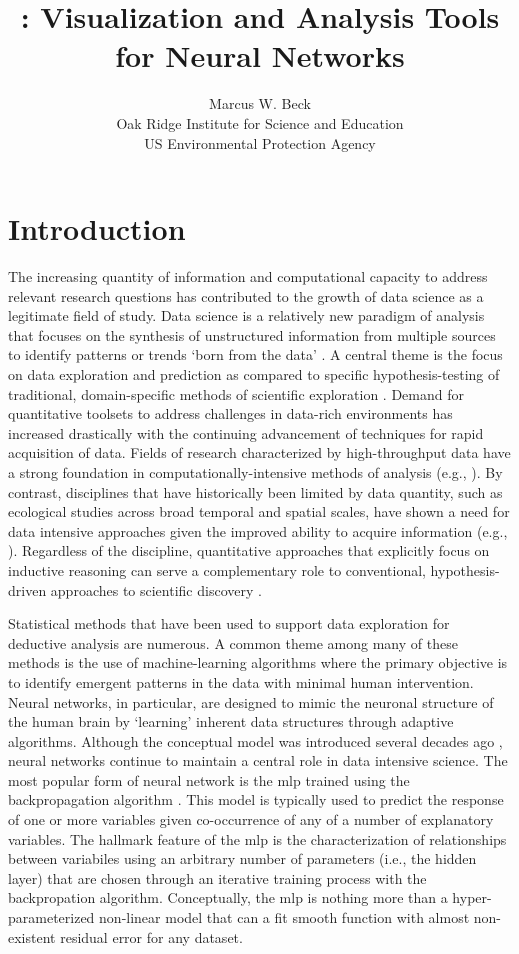 \documentclass[article]{jss}\usepackage[]{graphicx}\usepackage[]{color}
\author{Marcus W. Beck\\Oak Ridge Institute for Science and Education\\US Environmental Protection Agency}
\title{\pkg{NeuralNetTools}: Visualization and Analysis Tools for Neural Networks}
\begin{document}

\section[Introduction]{Introduction}

The increasing quantity of information and computational capacity to address relevant research questions has contributed to the growth of data science as a legitimate field of study.   Data science is a relatively new paradigm of analysis that focuses on the synthesis of unstructured information from multiple sources to identify patterns or trends `born from the data' \citep{Kelling09}.  A central theme is the focus on data exploration and prediction as compared to specific hypothesis-testing of traditional, domain-specific methods of scientific exploration \citep{Kell03}.  Demand for quantitative toolsets to address challenges in data-rich environments has increased drastically with the continuing advancement of techniques for rapid acquisition of data. Fields of research characterized by high-throughput data have a strong foundation in computationally-intensive methods of analysis (e.g., \citet{Saeys07}).  By contrast, disciplines that have historically been limited by data quantity, such as ecological studies across broad temporal and spatial scales, have shown a need for data intensive approaches given the improved ability to acquire information (e.g., \citet{Swanson15}).  Regardless of the discipline, quantitative approaches that explicitly focus on  inductive reasoning can serve a complementary role to conventional, hypothesis-driven approaches to scientific discovery \citep{Kell03}.  

Statistical methods that have been used to support data exploration for deductive analysis are numerous.  A common theme among many of these methods is the use of machine-learning algorithms where the primary objective is to identify emergent patterns in the data with minimal human intervention.  Neural networks, in particular, are designed to mimic the neuronal structure of the human brain by `learning' inherent data structures through adaptive algorithms.  Although the conceptual model was introduced several decades ago \citep{Maier00}, neural networks continue to maintain a central role in data intensive science.  The most popular form of neural network is the \ac{mlp} trained using the backpropagation algorithm \citep{Rumelhart86}.  This model is typically used to predict the response of one or more variables given co-occurrence of any of a number of explanatory variables.  The hallmark feature of the \ac{mlp} is the characterization of relationships between variabiles using an arbitrary number of parameters (i.e., the hidden layer) that are chosen through an iterative training process with the backpropation algorithm.  Conceptually, the \ac{mlp} is nothing more than a hyper-parameterized non-linear model that can a fit smooth function with almost non-existent residual error for any dataset.
\end{document}
